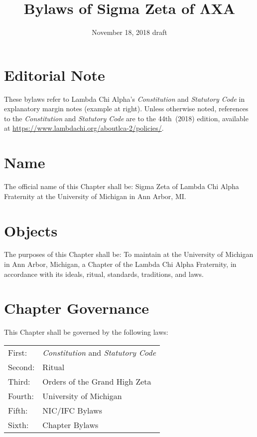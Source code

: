 \documentclass{article}
\title{Bylaws of Sigma Zeta of ΛΧΑ}
\date{November 18, 2018 draft}
\begin{document}
\maketitle

\section*{Editorial Note}

These bylaws refer to Lambda Chi Alpha’s \emph{Constitution} and \emph{Statutory
Code} in explanatory margin notes  (example
at right). Unless otherwise noted, references to the \emph{Constitution} and
\emph{Statutory Code} are to the 44th~(2018) edition, available at
\url{https://www.lambdachi.org/aboutlca-2/policies/}.

\section{Name}

The official name of this Chapter shall be: Sigma Zeta  of Lambda Chi Alpha Fraternity at the University
of Michigan in Ann Arbor, MI.

\section{Objects}

The purposes of this Chapter shall be: To maintain at the University of Michigan
in Ann Arbor, Michigan, a Chapter of the Lambda Chi Alpha Fraternity, in
accordance with its ideals, ritual, standards, traditions, and laws.

\section{Chapter Governance}

This Chapter shall be governed by the following laws:

\hspace*{-\tabcolsep}%
\begin{tabular}{ll}
  First:  & \emph{Constitution} and \emph{Statutory Code} \\
  Second: & Ritual                                        \\
  Third:  & Orders of the Grand High Zeta                 \\
  Fourth: & University of Michigan                        \\
  Fifth:  & NIC/IFC Bylaws                                \\
  Sixth:  & Chapter Bylaws                                \\
\end{tabular}
\end{document}
